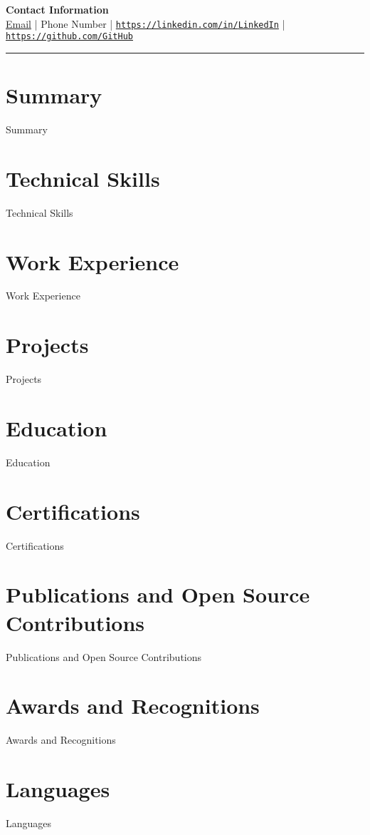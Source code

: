 \documentclass[a4paper,10pt]{article}
\begin{document}
\begin{center}
    {\Huge \textbf{{{Contact Information}}}}\\
    \href{mailto:{{Email}}}{{Email}} | {{Phone Number}} | 
    \href{https://linkedin.com/in/{{LinkedIn}}}{\texttt{https://linkedin.com/in/{{LinkedIn}}}} | 
    \href{https://github.com/{{GitHub}}}{\texttt{https://github.com/{{GitHub}}}}
\end{center}

\hrule

\section*{Summary}
{{Summary}}

\section*{Technical Skills}
\begin{itemize}
    {{Technical Skills}}
\end{itemize}

\section*{Work Experience}
{{Work Experience}}

\section*{Projects}
{{Projects}}

\section*{Education}
{{Education}}

\section*{Certifications}
{{Certifications}}

\section*{Publications and Open Source Contributions}
{{Publications and Open Source Contributions}}

\section*{Awards and Recognitions}
{{Awards and Recognitions}}

\section*{Languages}
\begin{itemize}
    {{Languages}}
\end{itemize}
\end{document}

